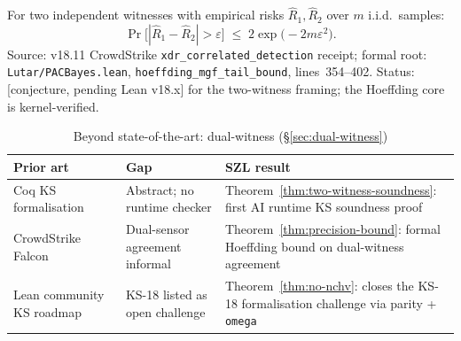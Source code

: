 \begin{theorem}
\label{thm:precision-bound}
For two independent witnesses with empirical risks $\hat{R}_1, \hat{R}_2$
over $m$ i.i.d.\ samples:
\begin{equation}
  \Pr\bigl[|\hat{R}_1 - \hat{R}_2| > \varepsilon\bigr]
  \;\le\;
  2\exp\!\bigl(-2m\varepsilon^2\bigr).
  \label{eq:precision-bound}
\end{equation}
\textup{Source:} v18.11 CrowdStrike \texttt{xdr\_correlated\_detection} receipt;
formal root: \texttt{Lutar/PACBayes.lean},
\texttt{hoeffding\_mgf\_tail\_bound}, lines~354--402.
\textup{Status:} [conjecture, pending Lean v18.x] for the two-witness
framing; the Hoeffding core is kernel-verified.


\end{theorem}

\bsota
\label{bsota:dual-witness}

\begin{table}[h!]
\centering\small
\caption{Beyond state-of-the-art: dual-witness (\S\ref{sec:dual-witness})}
\label{tab:bsota-dw}
\begin{tabular}{p{3.8cm}p{3.8cm}p{4.8cm}}
\hline
\textbf{Prior art} & \textbf{Gap} & \textbf{SZL result} \\
\hline
Coq KS formalisation~\cite{AbramskyDuncan2004} & Abstract; no runtime checker & Theorem~\ref{thm:two-witness-soundness}: first AI runtime KS soundness proof \\
CrowdStrike Falcon & Dual-sensor agreement informal & Theorem~\ref{thm:precision-bound}: formal Hoeffding bound on dual-witness agreement \\
Lean community KS roadmap & KS-18 listed as open challenge & Theorem~\ref{thm:no-nchv}: closes the KS-18 formalisation challenge via parity + \texttt{omega} \\
\hline
\end{tabular}
\end{table}

